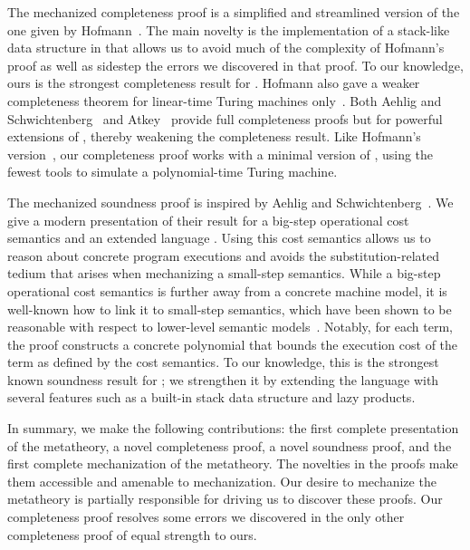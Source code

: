 The mechanized completeness proof is a simplified and streamlined version of the one given by Hofmann~\cite{hofmannStrengthNonsizeIncreasing2002}. The main novelty is the implementation of a stack-like data structure in \lfpl that allows us to avoid much of the complexity of Hofmann's proof as well as sidestep the errors we discovered in that proof. To our knowledge, ours is the strongest completeness result for \lfpl. Hofmann also gave a weaker completeness theorem for linear-time Turing machines only~\cite{hofmannLinearTypesNonsizeincreasing1999}. Both Aehlig and Schwichtenberg~\cite{aehligSyntacticalAnalysisNonsizeincreasing2002} and Atkey~\cite{atkeyPolynomialTimeDependent2024} provide full completeness proofs but for powerful extensions of \lfpl, thereby weakening the completeness result. Like Hofmann's version~\cite{hofmannStrengthNonsizeIncreasing2002}, our completeness proof works with a minimal version of \lfpl, using the fewest tools to simulate a polynomial-time Turing machine.

\enlargethispage{\baselineskip}

The mechanized soundness proof is inspired by Aehlig and Schwichtenberg~\cite{aehligSyntacticalAnalysisNonsizeincreasing2002}. We give a modern presentation of their result for a big-step operational cost semantics and an extended language \lfplplus. Using this cost semantics allows us to reason about concrete program executions and avoids the substitution-related tedium that arises when mechanizing a small-step semantics. While a big-step operational cost semantics is further away from a concrete machine model, it is well-known how to link it to small-step semantics, which have been shown to be reasonable with respect to lower-level semantic models~\cite{blellochProvableTimeSpace1996,Accattoli2019}.
%
Notably, for each \lfplplus term, the proof constructs a concrete polynomial that bounds the execution cost of the term as defined by the cost semantics.
%
To our knowledge, this is the strongest known soundness result for \lfpl;
%
we strengthen it by extending the language with several features such
as a built-in stack data structure and lazy products.

In summary, we make the following contributions: the first complete presentation of the \lfpl metatheory, a novel completeness proof, a novel soundness proof, and the first complete mechanization of the \lfpl metatheory. The novelties in the proofs make them accessible and amenable to mechanization. Our desire to mechanize the \lfpl metatheory is partially responsible for driving us to discover these proofs. Our completeness proof resolves some errors we discovered in the only other completeness proof of equal strength to ours.
